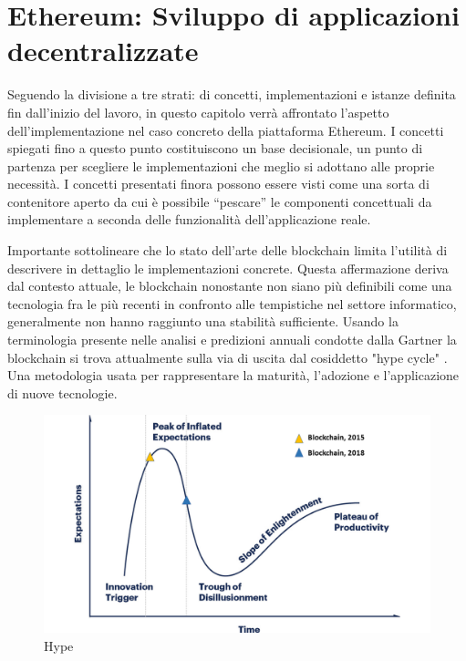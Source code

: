 \chapter{Ethereum: Sviluppo di applicazioni decentralizzate}

Seguendo la divisione a tre strati: di concetti, implementazioni e istanze definita fin dall'inizio del lavoro, in questo capitolo verrà affrontato l'aspetto dell'implementazione nel caso concreto della piattaforma Ethereum. I concetti spiegati fino a questo punto costituiscono un base decisionale, un punto di partenza per scegliere le implementazioni che meglio si adottano alle proprie necessità. I concetti presentati finora possono essere visti come una sorta di contenitore aperto da cui è possibile “pescare” le componenti concettuali da implementare a seconda delle funzionalità dell’applicazione reale. 

Importante sottolineare che lo stato dell'arte delle blockchain limita l’utilità di descrivere in dettaglio le implementazioni concrete. Questa affermazione deriva dal contesto attuale, le blockchain nonostante non siano più definibili come una tecnologia fra le più recenti in confronto alle tempistiche nel settore informatico, generalmente non hanno raggiunto una stabilità sufficiente. Usando la terminologia presente nelle analisi e predizioni annuali condotte dalla Gartner la blockchain si trova attualmente sulla via di uscita dal cosiddetto "hype cycle" \smallskip {}. Una metodologia usata per rappresentare la maturità, l'adozione e l'applicazione di nuove tecnologie.

\begin{figure}[H]
\centering
\includegraphics[width=1\textwidth]{immagini/blockchainHype.png}
\caption{Hype}
\label{fig:mesh7}
\end{figure}

